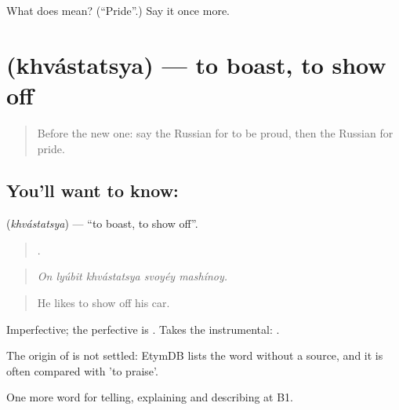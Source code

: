 \begin{tcolorbox}[breakable,colback=teal!4,colframe=teal!35!black,title={Before you move on}]
What does  mean? (\textquotedblleft{}Pride\textquotedblright{}.) Say it once more.
\end{tcolorbox}
\section[\texorpdfstring{\ru{хвастаться} (khvástatsya)}{хвастаться (khvástatsya)}]{ (khvástatsya) — to boast, to show off}

\label{lesson:RU-C475-khvastatsya}



\begin{quote}
Before the new one: say the Russian for to be proud, then the Russian for pride.
\end{quote}

\subsection*{You'll want to know: }
\textbf{} (\emph{khvástatsya}) — \textquotedblleft{}to boast, to show off\textquotedblright{}.

\begin{quote}
    .
\end{quote}

\begin{quote}
\emph{On lyúbit khvástatsya svoyéy mashínoy.}
\end{quote}

\begin{quote}
He likes to show off his car.
\end{quote}

Imperfective; the perfective is . Takes the instrumental: \emph{ }.

\begin{cousinweb}
The origin of \emph{} is not settled: EtymDB lists the word without a source, and it is often compared with \emph{} 'to praise'.
\end{cousinweb}

\begin{grammarlens}[title={What you've built}]
One more word for telling, explaining and describing at B1.
\end{grammarlens}


